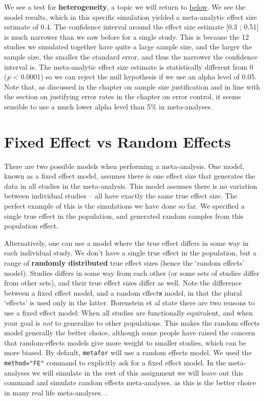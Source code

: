 \documentclass[
  oneside]{book}
\begin{document}
We see a test for \textbf{heterogeneity}, a topic we will return to \protect\hyperlink{heterogeneity}{below}. We see the model results, which in this specific simulation yielded a meta-analytic effect size estimate of 0.4. The confidence interval around the effect size estimate {[}0.3 ; 0.51{]} is much narrower than we saw before for a single study. This is because the 12 studies we simulated together have quite a large sample size, and the larger the sample size, the smaller the standard error, and thus the narrower the confidence interval is. The meta-analytic effect size estimate is statistically different from 0 (\emph{p} \textless{} 0.0001) so we can reject the null hypothesis if we use an alpha level of 0.05. Note that, as discussed in the chapter on sample size justification and in line with the section on justifying error rates in the chapter on error control, it seems sensible to use a much lower alpha level than 5\% in meta-analyses.

\hypertarget{fixed-effect-vs-random-effects}{%
\section{Fixed Effect vs Random Effects}\label{fixed-effect-vs-random-effects}}

There are two possible models when performing a meta-analysis. One model, known as a fixed effect model, assumes there is one effect size that generates the data in all studies in the meta-analysis. This model assumes there is no variation between individual studies -- all have exactly the same true effect size. The perfect example of this is the simulations we have done so far. We specified a single true effect in the population, and generated random samples from this population effect.

Alternatively, one can use a model where the true effect differs in some way in each individual study. We don't have a single true effect in the population, but a range of \textbf{randomly distributed} true effect sizes (hence the `random effects' model). Studies differs in some way from each other (or some sets of studies differ from other sets), and their true effect sizes differ as well. Note the difference between a fixed effect model, and a random effect\textbf{s} model, in that the plural `effects' is used only in the latter. Borenstein et al \citeyearpar{borenstein_introduction_2009} state there are two reasons to use a fixed effect model: When all studies are functionally equivalent, and when your goal is \emph{not} to generalize to other populations. This makes the random effects model generally the better choice, although some people have raised the concern that random-effects models give more weight to smaller studies, which can be more biased. By default, \texttt{metafor} will use a random effects model. We used the \texttt{method="FE"} command to explicitly ask for a fixed effect model. In the meta-analyses we will simulate in the rest of this assignment we will leave out this command and simulate random effects meta-analyses, as this is the better choice in many real life meta-analyses. .
\end{document}
